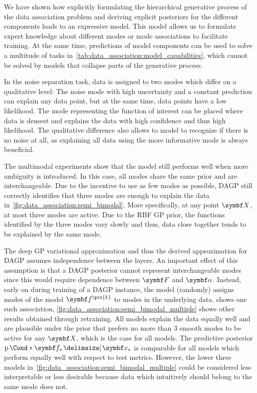 We have shown how explicitly formulating the hierarchical generative process of the data association problem and deriving explicit posteriors for the different components leads to an expressive model.
This model allows us to formulate expert knowledge about different modes or mode associations to facilitate training.
At the same time, predictions of model components can be used to solve a multitude of tasks in~\cref{tab:data_association:model_capabilities}, which cannot be solved by models that collapse parts of the generative process.

In the noise separation task, data is assigned to two modes which differ on a qualitative level:
The noise mode with high uncertainty and a constant prediction can explain any data point, but at the same time, data points have a low likelihood.
The mode representing the function of interest can be placed where data is densest and explains the data with high confidence and thus high likelihood.
The qualitative difference also allows to model to recognize if there is no noise at all, as explaining all data using the more informative mode is always beneficial.

The multimodal experiments show that the model still performs well when more ambiguity is introduced.
In this case, all modes share the same prior and are interchangeable.
Due to the incentive to use as few modes as possible, DAGP still correctly identifies that three modes are enough to explain the data in~\cref{fig:data_association:semi_bimodal}.
More specifically, at any point $\mat{X}$, at most three modes are active.
Due to the RBF GP prior, the functions identified by the three modes vary slowly and thus, data close together tends to be explained by the same mode.

The deep GP variational approximation and thus the derived approximation for DAGP assumes independence between the layers.
An important effect of this assumption is that a DAGP posterior cannot represent interchangeable modes since this would require dependence between $\mat{F}$ and $\mat{\alpha}$.
Instead, early on during training of a DAGP instance, the model (randomly) assigns modes of the model $\mat{f}^{\pix{k}}$ to modes in the underlying data.  shows one such association, \cref{fig:data_association:semi_bimodal_multiple} shows other results obtained through retraining.
All models explain the data equally well and are plausible under the prior that prefers no more than 3 smooth modes to be active for any $\mat{X}$, which is the case for all models.
The predictive posterior $\Prob*{\mat{f}_\ast \given \mat{x}_\ast}$ is comparable for all models which perform equally well with respect to test metrics.
However, the lower three models in~\cref{fig:data_association:semi_bimodal_multiple} could be considered less interpretable or less desirable because data which intuitively should belong to the same mode does not.

